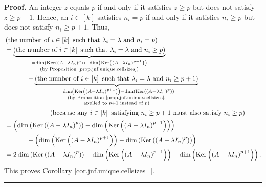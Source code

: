 \documentclass[numbers=enddot,12pt,final,onecolumn,notitlepage]{scrartcl}%
\numberwithin{exer}{subsection}
\theoremstyle{definition}
\newenvironment{proof}[1][Proof]{\noindent\textbf{#1.} }{\ \rule{0.5em}{0.5em}}
\begin{document}
\begin{proof}
An integer $z$ equals $p$ if and only if it satisfies $z\geq p$ but does not
satisfy $z\geq p+1$. Hence, an $i\in\left[  k\right]  $ satisfies $n_{i}=p$ if
and only if it satisfies $n_{i}\geq p$ but does not satisfy $n_{i}\geq p+1$.
Thus,%
\begin{align*}
&  \left(  \text{the number of }i\in\left[  k\right]  \text{ such that
}\lambda_{i}=\lambda\text{ and }n_{i}=p\right) \\
&  =\underbrace{\left(  \text{the number of }i\in\left[  k\right]  \text{ such
that }\lambda_{i}=\lambda\text{ and }n_{i}\geq p\right)  }_{\substack{=\dim
\left(  \operatorname*{Ker}\left(  \left(  A-\lambda I_{n}\right)
^{p}\right)  \right)  -\dim\left(  \operatorname*{Ker}\left(  \left(
A-\lambda I_{n}\right)  ^{p-1}\right)  \right)  \\\text{(by Proposition
\ref{prop.jnf.unique.cellsizes})}}}\\
&  \ \ \ \ \ \ \ \ \ \ -\underbrace{\left(  \text{the number of }i\in\left[
k\right]  \text{ such that }\lambda_{i}=\lambda\text{ and }n_{i}\geq
p+1\right)  }_{\substack{=\dim\left(  \operatorname*{Ker}\left(  \left(
A-\lambda I_{n}\right)  ^{p+1}\right)  \right)  -\dim\left(
\operatorname*{Ker}\left(  \left(  A-\lambda I_{n}\right)  ^{p}\right)
\right)  \\\text{(by Proposition \ref{prop.jnf.unique.cellsizes}%
,}\\\text{applied to }p+1\text{ instead of }p\text{)}}}\\
&  \ \ \ \ \ \ \ \ \ \ \ \ \ \ \ \ \ \ \ \ \left(  \text{because any }%
i\in\left[  k\right]  \text{ satisfying }n_{i}\geq p+1\text{ must also satisfy
}n_{i}\geq p\right) \\
&  =\left(  \dim\left(  \operatorname*{Ker}\left(  \left(  A-\lambda
I_{n}\right)  ^{p}\right)  \right)  -\dim\left(  \operatorname*{Ker}\left(
\left(  A-\lambda I_{n}\right)  ^{p-1}\right)  \right)  \right) \\
&  \ \ \ \ \ \ \ \ \ \ -\left(  \dim\left(  \operatorname*{Ker}\left(  \left(
A-\lambda I_{n}\right)  ^{p+1}\right)  \right)  -\dim\left(
\operatorname*{Ker}\left(  \left(  A-\lambda I_{n}\right)  ^{p}\right)
\right)  \right) \\
&  =2\dim\left(  \operatorname*{Ker}\left(  \left(  A-\lambda I_{n}\right)
^{p}\right)  \right)  -\dim\left(  \operatorname*{Ker}\left(  \left(
A-\lambda I_{n}\right)  ^{p-1}\right)  \right)  -\dim\left(
\operatorname*{Ker}\left(  \left(  A-\lambda I_{n}\right)  ^{p+1}\right)
\right)  .
\end{align*}
This proves Corollary \ref{cor.jnf.unique.cellsizes=}.
\end{proof}
\end{document}
